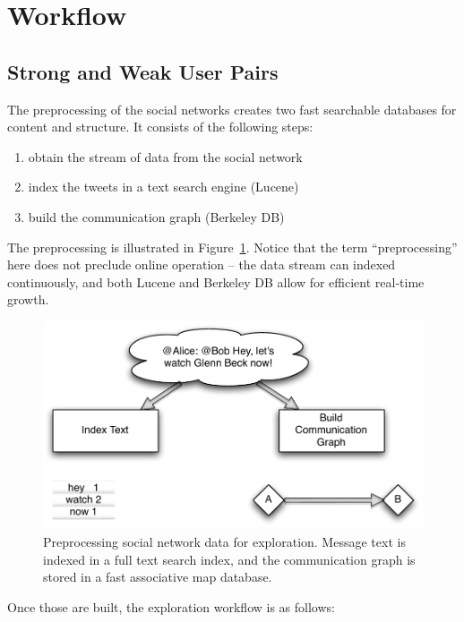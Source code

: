 \section{Workflow}

\subsection{Strong and Weak User Pairs}

The preprocessing of the social networks creates two fast searchable databases for content and structure.  It consists of the following steps:

\begin{enumerate}
	\item obtain the stream of data from the social network
	\item index the tweets in a text search engine (Lucene)
	\item build the communication graph (Berkeley DB)
\end{enumerate}

The preprocessing is illustrated in Figure~\ref{figure:preprocessing}.  Notice that the term ``preprocessing'' here does not preclude online operation -- the data stream can indexed continuously, and both Lucene and Berkeley DB allow for efficient real-time growth.

\begin{figure}[htp]
\includegraphics{figures/spie-preprocessing}
\caption{Preprocessing social network data for exploration.  Message text is indexed in a full text search index, and the communication graph is stored in a fast associative map database.}
\label{figure:preprocessing}
\end{figure}


Once those are built, the exploration workflow is as follows:

